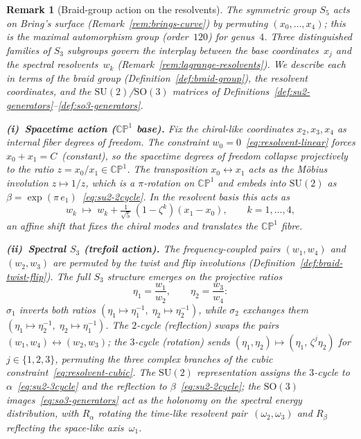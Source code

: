 \documentclass[12pt,a4paper]{report}
\newtheorem{remark}[theorem]{Remark}
\begin{document}
\begin{remark}[Braid-group action on the resolvents]
\label{rem:braid-group-action}
The symmetric group $S_5$ acts on Bring's surface
(Remark~\ref{rem:brings-curve}) by permuting
$(x_0,\dots,x_4)$; this is the maximal automorphism group
(order~$120$) for genus~$4$.  Three distinguished families of $S_3$
subgroups govern the interplay between the base coordinates~$x_j$ and the
spectral resolvents~$w_k$
(Remark~\ref{rem:lagrange-resolvents}).  We describe each in terms of the
braid group (Definition~\ref{def:braid-group}), the resolvent coordinates,
and the $\mathrm{SU}(2)$/$\mathrm{SO}(3)$ matrices of
Definitions~\ref{def:su2-generators}--\ref{def:so3-generators}.

\medskip
\noindent\textbf{(i)~Spacetime action ($\mathbb{CP}^1$ base).}\;
Fix the chiral-like coordinates $x_2,x_3,x_4$ as internal fiber
degrees of freedom.  The constraint
$w_0=0$~\eqref{eq:resolvent-linear} forces $x_0+x_1=C$~(constant), so
the spacetime degrees of freedom collapse projectively to the ratio
$z=x_0/x_1\in\mathbb{CP}^1$.  The transposition
$x_0\leftrightarrow x_1$ acts as the M\"obius involution
$z\mapsto 1/z$, which is a $\pi$-rotation on $\mathbb{CP}^1$ and embeds
into $\mathrm{SU}(2)$ as $\beta=\exp(\pi\,e_1)$~\eqref{eq:su2-2cycle}.
In the resolvent basis this acts as
\begin{equation}\label{eq:spacetime-shift}
  w_k\;\longmapsto\;
  w_k+\tfrac{1}{\sqrt{5}}\,(1-\zeta^k)(x_1-x_0),
  \qquad k=1,\dots,4,
\end{equation}
an affine shift that fixes the chiral modes and translates the
$\mathbb{CP}^1$ fibre.

\medskip
\noindent\textbf{(ii)~Spectral $S_3$ (trefoil action).}\;
The frequency-coupled pairs $(w_1,w_4)$ and $(w_2,w_3)$ are permuted by
the twist and flip involutions
(Definition~\ref{def:braid-twist-flip}).
The full
$S_3$ structure emerges on the projective ratios
\[
  \eta_1=\frac{w_1}{w_2},\qquad\eta_2=\frac{w_3}{w_4}:
\]
$\sigma_1$ inverts both ratios $(\eta_1\mapsto\eta_1^{-1},\;
\eta_2\mapsto\eta_2^{-1})$, while $\sigma_2$ exchanges them
$(\eta_1\mapsto\eta_2^{-1},\;\eta_2\mapsto\eta_1^{-1})$.  The
$2$-cycle (reflection) swaps the pairs
$(w_1,w_4)\leftrightarrow(w_2,w_3)$; the $3$-cycle (rotation) sends
$(\eta_1,\eta_2)\mapsto(\eta_1,\,\zeta^j\eta_2)$ for $j\in\{1,2,3\}$,
permuting the three complex branches of the cubic
constraint~\eqref{eq:resolvent-cubic}.  The
$\mathrm{SU}(2)$ representation assigns the $3$-cycle to
$\alpha$~\eqref{eq:su2-3cycle} and the reflection to
$\beta$~\eqref{eq:su2-2cycle}; the $\mathrm{SO}(3)$
images~\eqref{eq:so3-generators} act as the holonomy on the spectral
energy distribution, with $R_\alpha$ rotating the time-like resolvent
pair~$(\omega_2,\omega_3)$ and $R_\beta$ reflecting the space-like
axis~$\omega_1$.


\end{remark}
\end{document}
